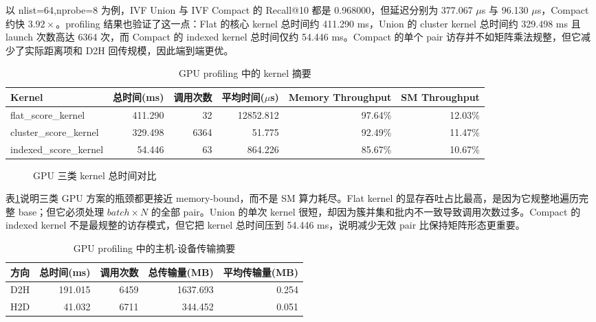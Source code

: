 \documentclass[a4paper]{article}
\begin{document}
以 nlist=64,nprobe=8 为例，IVF Union 与 IVF Compact 的 Recall@10 都是 0.968000，但延迟分别为 377.067 $\mu$s 与 96.130 $\mu$s，Compact 约快 $3.92\times$。profiling 结果也验证了这一点：Flat 的核心 kernel 总时间约 411.290 ms，Union 的 cluster kernel 总时间约 329.498 ms 且 launch 次数高达 6364 次，而 Compact 的 indexed kernel 总时间仅约 54.446 ms。Compact 的单个 pair 访存并不如矩阵乘法规整，但它减少了实际距离项和 D2H 回传规模，因此端到端更优。

\begin{table}[H]
\centering
\scriptsize
\caption{GPU profiling 中的 kernel 摘要}
\label{tab:gpu-kernel-profile}
\begin{tabular}{lrrrrr}
\toprule
Kernel & 总时间(ms) & 调用次数 & 平均时间($\mu$s) & Memory Throughput & SM Throughput \\
\midrule
flat\_score\_kernel & 411.290 & 32 & 12852.812 & 97.64\% & 12.03\% \\
cluster\_score\_kernel & 329.498 & 6364 & 51.775 & 92.49\% & 11.47\% \\
indexed\_score\_kernel & 54.446 & 63 & 864.226 & 85.67\% & 10.67\% \\
\bottomrule
\end{tabular}
\end{table}

\begin{figure}[H]
\centering
{}
\caption{GPU 三类 kernel 总时间对比}
\label{fig:gpu-kernel-time}
\end{figure}

表\ref{tab:gpu-kernel-profile}说明三类 GPU 方案的瓶颈都更接近 memory-bound，而不是 SM 算力耗尽。Flat kernel 的显存吞吐占比最高，是因为它规整地遍历完整 base；但它必须处理 $batch\times N$ 的全部 pair。Union 的单次 kernel 很短，却因为簇并集和批内不一致导致调用次数过多。Compact 的 indexed kernel 不是最规整的访存模式，但它把 kernel 总时间压到 54.446 ms，说明减少无效 pair 比保持矩阵形态更重要。

\begin{table}[H]
\centering
\small
\caption{GPU profiling 中的主机-设备传输摘要}
\label{tab:gpu-memcpy-profile}
\begin{tabular}{lrrrr}
\toprule
方向 & 总时间(ms) & 调用次数 & 总传输量(MB) & 平均传输量(MB) \\
\midrule
D2H & 191.015 & 6459 & 1637.693 & 0.254 \\
H2D & 41.032 & 6711 & 344.452 & 0.051 \\
\bottomrule
\end{tabular}
\end{table}
\end{document}
